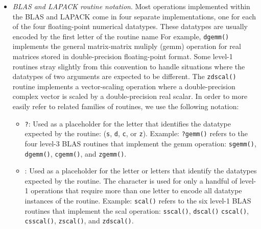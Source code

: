 \begin{itemize}
\item
{\em BLAS and LAPACK routine notation}.
Most operations implemented within the BLAS and LAPACK come in four separate
implementations, one for each of the four floating-point numerical datatypes.
These datatypes are usually encoded by the first letter of the routine name
For example, {\tt dgemm()} implements the general matrix-matrix muliply
({\sc gemm}) operation for real matrices stored in double-precision
floating-point format.
Some level-1 routines stray slightly from this convention to handle situations
where the datatypes of two arguments are expected to be different.
The {\tt zdscal()} routine implements a vector-scaling operation where a
double-precision complex vector is scaled by a double-precision real scalar.
In order to more easily refer to related families of routines, we use the
following notation:
\begin{itemize}
\item {\tt ?}: Used as a placeholder for the letter that identifies the
datatype expected by the routine: ({\tt s}, {\tt d}, {\tt c}, or {\tt z}).
Example: {\tt ?gemm()} refers to the four level-3 BLAS routines that implement
the {\sc gemm} operation: {\tt sgemm()}, {\tt dgemm()}, {\tt cgemm()}, and
{\tt zgemm()}.
\item {\tt *}: Used as a placeholder for the letter or letters that identify
the datatypes expected by the routine.
The {\tt *} character is used for only a handful of level-1 operations that
require more than one letter to encode all datatype instances of the routine.
Example: {\tt *scal()} refers to the six level-1 BLAS routines that implement
the {\sc scal} operation: {\tt sscal()}, {\tt dscal()} {\tt cscal()},
{\tt csscal()}, {\tt zscal()}, and {\tt zdscal()}.
\end{itemize}


\end{itemize}
